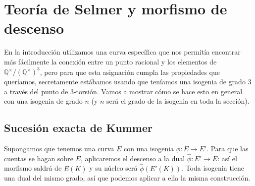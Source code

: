 \documentclass[a4paper]{book}
\theoremstyle{definition}
\theoremstyle{plain}
\newcommand{\QQ}{\mathbb{Q}}
\newcommand{\QmodT}{\QQ^\times/{(\QQ^\times)}^3}
\begin{document}
\section{Teoría de Selmer y morfismo de descenso}

En la introducción utilizamos una curva específica que nos permitía encontrar más fácilmente la conexión entre un punto racional y los elementos de $\QmodT$, pero para que esta asignación cumpla las propiedades que queríamos, secretamente estábamos usando que teníamos una isogenia de grado 3 a través del punto de 3-torsión. Vamos a mostrar cómo se hace esto en general con una isogenia de grado $n$ (y $n$ será el grado de la isogenia en toda la sección).

\subsection{Sucesión exacta de Kummer}

Supongamos que tenemos una curva $E$ con una isogenia $\phi:E\to E'$. Para que las cuentas se hagan sobre $E$, aplicaremos el descenso a la dual $\hat\phi:E'\to E$: así el morfismo saldrá de $E(K)$ y su núcleo será $\hat\phi(E'(K))$. Toda isogenia tiene una dual del mismo grado, así que podemos aplicar a ella la misma construcción.
\end{document}
